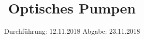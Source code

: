 

\subject{V21}
\title{Optisches Pumpen}
\date{
  Durchführung: 12.11.2018
  \hspace{3em}
  Abgabe: 23.11.2018
}



\maketitle
\thispagestyle{empty}
\tableofcontents
\newpage
\setcounter{page}{1}





\printbibliography


